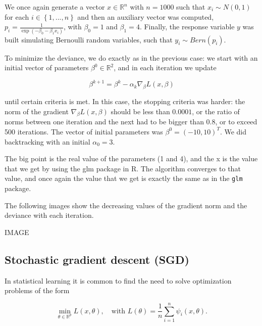 We once again generate a vector $x \in \mathbb{R}^n$ with $n = 1000$ such that $x_i \sim N(0, 1)$ for each $i \in \left\{1, ..., n \right\}$ and then an auxiliary vector was computed, $p_i = \frac{1}{\exp \left( - \beta_0 - \beta_1 x_i \right)}$, with $\beta_0 = 1$ and $\beta_1 = 4$. Finally, the response variable $y$ was built simulating Bernoulli random variables, such that $y_i \sim Bern(p_i)$. 


To minimize the deviance, we do exactly as in the previous case: we start with an initial vector of parameters $\beta^0 \in \mathbb{R}^2$, and in each iteration we update

$$
\beta^{k+1} = \beta^k - \alpha_k \nabla_{\beta} L(x, \beta)
$$

until certain criteria is met. In this case, the stopping criteria was harder: the norm of the gradient $\nabla_{\beta} L(x, \beta)$ should be less than $0.0001$, or the ratio of norms between one iteration and the next had to be bigger than $0.8$, or to exceed 500 iterations. The vector of initial parameters was $\beta^0 = (-10, 10)^T$. We did backtracking with an initial $\alpha_0 = 3$.


The big point is the real value of the parameters (1 and 4), and the x is the value that we get by using the glm package in R. The algorithm converges to that value, and once again the value that we get is exactly the same as in the \texttt{glm} package.

The following images show the decreasing values of the gradient norm and the deviance with each iteration.





IMAGE


\subsection{Stochastic gradient descent (SGD)}

In statistical learning it is common to find the need to solve optimization problems of the form

\begin{equation}
\min_{\theta \in \mathbb{R}^p} L(x, \theta), \quad \text{with} \, \, 
L(\theta) = \frac{1}{n} \sum_{i = 1}^n { \psi_i(x, \theta) }.
\end{equation}

